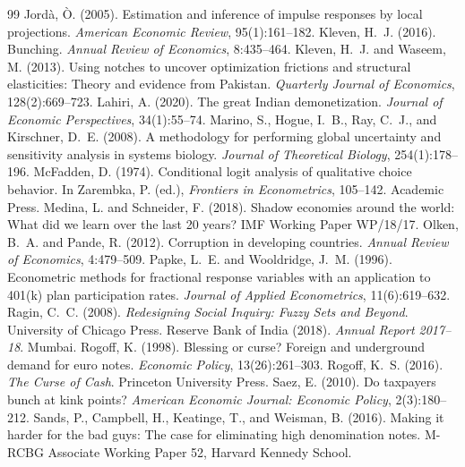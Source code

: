 \documentclass[11pt]{article}
\theoremstyle{definition}
\theoremstyle{remark}
\begin{document}
\begin{thebibliography}{99}
 Jord\`a, \`O. (2005). Estimation and inference of impulse responses by local projections. \textit{American Economic Review}, 95(1):161--182.
 Kleven, H.~J. (2016). Bunching. \textit{Annual Review of Economics}, 8:435--464.
 Kleven, H.~J. and Waseem, M. (2013). Using notches to uncover optimization frictions and structural elasticities: Theory and evidence from Pakistan. \textit{Quarterly Journal of Economics}, 128(2):669--723.
 Lahiri, A. (2020). The great Indian demonetization. \textit{Journal of Economic Perspectives}, 34(1):55--74.
 Marino, S., Hogue, I.~B., Ray, C.~J., and Kirschner, D.~E. (2008). A methodology for performing global uncertainty and sensitivity analysis in systems biology. \textit{Journal of Theoretical Biology}, 254(1):178--196.
 McFadden, D. (1974). Conditional logit analysis of qualitative choice behavior. In Zarembka, P. (ed.), \textit{Frontiers in Econometrics}, 105--142. Academic Press.
 Medina, L. and Schneider, F. (2018). Shadow economies around the world: What did we learn over the last 20 years? IMF Working Paper WP/18/17.
 Olken, B.~A. and Pande, R. (2012). Corruption in developing countries. \textit{Annual Review of Economics}, 4:479--509.
 Papke, L.~E. and Wooldridge, J.~M. (1996). Econometric methods for fractional response variables with an application to 401(k) plan participation rates. \textit{Journal of Applied Econometrics}, 11(6):619--632.
 Ragin, C.~C. (2008). \textit{Redesigning Social Inquiry: Fuzzy Sets and Beyond}. University of Chicago Press.
 Reserve Bank of India (2018). \textit{Annual Report 2017--18}. Mumbai.
 Rogoff, K. (1998). Blessing or curse? Foreign and underground demand for euro notes. \textit{Economic Policy}, 13(26):261--303.
 Rogoff, K.~S. (2016). \textit{The Curse of Cash}. Princeton University Press.
 Saez, E. (2010). Do taxpayers bunch at kink points? \textit{American Economic Journal: Economic Policy}, 2(3):180--212.
 Sands, P., Campbell, H., Keatinge, T., and Weisman, B. (2016). Making it harder for the bad guys: The case for eliminating high denomination notes. M-RCBG Associate Working Paper 52, Harvard Kennedy School.

\end{thebibliography}
\end{document}
